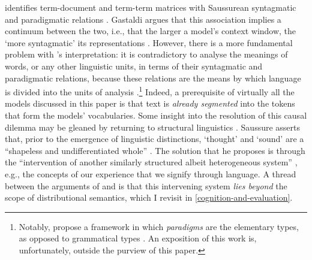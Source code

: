 \citeauthor{Sahlgren2008} identifies term-document and term-term matrices with
Saussurean syntagmatic and paradigmatic relations \parencites*[7-12]{Sahlgren2008}.
Gastaldi argues that this association implies a continuum between the two, i.e., that
the larger a model's context window, the `more syntagmatic' its representations
\parencites*[179]{Gastaldi2021}.
However, there is a more fundamental problem with \citeauthor{Sahlgren2008}'s
interpretation: it is contradictory to analyse the meanings of words, or any other
linguistic units, in terms of their syntagmatic and paradigmatic relations, because
these relations are the means by which language is divided into the units of analysis
\parencites[196-199]{Gastaldi2021}[582]{Gastaldi2021a}.\footnote{Notably,
  \citeauthor{Gastaldi2021a} propose a framework in which \emph{paradigms} are the
  elementary types, as opposed to grammatical types .
  An exposition of this work is, unfortunately, outside the purview of this paper.
}
Indeed, a prerequisite of virtually all the models discussed in this paper is that text
is \emph{already segmented} into the tokens that form the models' vocabularies.
Some insight into the resolution of this causal dilemma may be gleaned by returning to
structural linguistics .
Saussure asserts that, prior to the emergence of linguistic distinctions, `thought' and
`sound' are a ``shapeless and undifferentiated whole''
\parencites[18,78]{Matthews2001}.
The solution that he proposes is through the ``intervention of another similarly
structured albeit heterogeneous system'' \parencites[197]{Gastaldi2021}, e.g., the
concepts of our experience that we signify through language.
A thread between the arguments of \citeauthor{Gastaldi2021} and \textcites{Westera2019}
is that this intervening system \emph{lies beyond} the scope of distributional
semantics, which I revisit in \cref{cognition-and-evaluation}.
